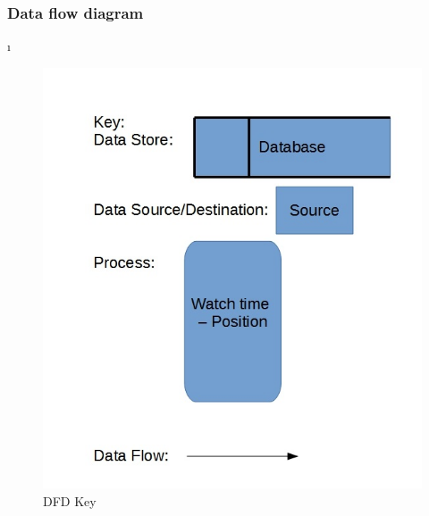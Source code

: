 \subsubsection{Data flow diagram}\i

\begin{figure}[H]
    \includegraphics[width=\textwidth]{./DFD/Done/JPG/DFDKey.jpg}
    \caption{DFD Key} \label{fig:DFD key}
\end{figure}

